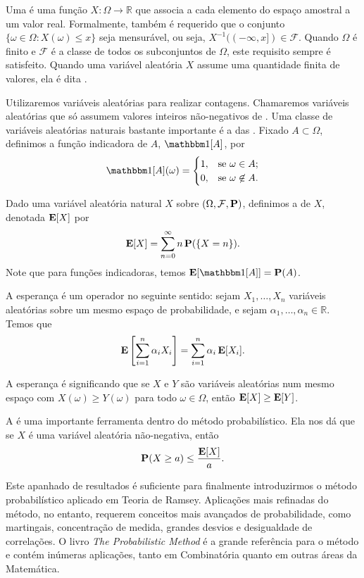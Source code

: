 Uma  é uma função $X: \Omega \to \mathbb{R}$ que associa a cada elemento do espaço amostral a um valor real. Formalmente, também é requerido que o conjunto $\{ \omega \in \Omega : X(\omega) \leq x \}$ seja mensurável, ou seja, $X^{-1}( (-\infty,x]) \in \mathcal{F}$. Quando $\Omega$ é finito e $\mathcal{F}$ é a classe de todos os subconjuntos de $\Omega$, este requisito sempre é satisfeito. Quando uma variável aleatória $X$ assume uma quantidade finita de valores, ela é dita .

Utilizaremos variáveis aleatórias para realizar contagens. Chamaremos  variáveis aleatórias que só assumem valores inteiros não-negativos de . Uma classe de variáveis aleatórias naturais bastante importante é a das . Fixado $A \subset \Omega$, definimos a função indicadora de $A$, $\ind{A}$, por
\[ \ind{A}(\omega) = \begin{cases}
  1, & \text{se } \omega \in A; \\
  0, & \text{se } \omega \not\in A.
\end{cases}\]

Dado uma variável aleatória natural $X$ sobre $(\Omega, \mathcal{F}, \operatorname{\mathbf{P}})$, definimos a  de $X$, denotada $\operatorname{\mathbf{E}}[X]$ por
\[ \operatorname{\mathbf{E}}[X] = \sum_{n = 0}^{\infty} n \operatorname{\mathbf{P}}(\{X = n\}).\]
Note que para funções indicadoras, temos $\expec[\ind{A}] = \prob(A)$.

A esperança é um operador  no seguinte sentido: sejam $X_1, \dots, X_n$ variáveis aleatórias sobre um mesmo espaço de probabilidade, e sejam $\alpha_1, \dots, \alpha_n \in \mathbb{R}$. Temos que
\[ \operatorname{\mathbf{E}}\left[ \sum_{i=1}^n \alpha_i X_i \right] = \sum_{i = 1}^{n} \alpha_i \operatorname{\mathbf{E}}[X_i]. \]

A esperança é  significando que se $X$ e $Y$ são variáveis aleatórias num mesmo espaço com $X(\omega) \geq Y(\omega)$ para todo $\omega \in \Omega$, então $\operatorname{\mathbf{E}}[X] \geq \operatorname{\mathbf{E}}[Y]$.

A  é uma importante ferramenta dentro do método probabilístico. Ela nos dá que se $X$ é uma variável aleatória não-negativa, então
\[ \operatorname{\mathbf{P}}(X \geq a) \leq \frac{\operatorname{\mathbf{E}}[X]}{a}. \]



Este apanhado de resultados é suficiente para finalmente introduzirmos o método probabilístico aplicado em Teoria de Ramsey. Aplicações mais refinadas do método, no entanto, requerem conceitos mais avançados de probabilidade, como martingais, concentração de medida, grandes desvios e desigualdade de correlações. O livro \emph{The Probabilistic Method} \cite{alon} é a grande referência para o método e contém inúmeras aplicações, tanto em Combinatória quanto em outras áreas da Matemática.

